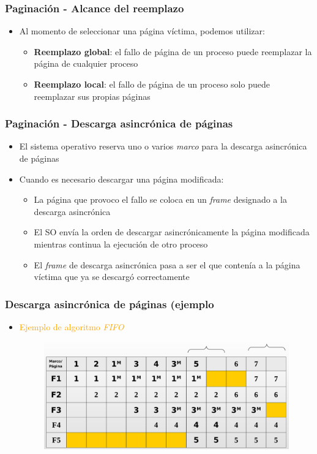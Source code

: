 \begin{frame}
  \frametitle{Paginación - Alcance del reemplazo}
  \begin{itemize}
  	\item Al momento de seleccionar una página víctima, podemos utilizar:
  	\begin{itemize}
  		\item \textbf{Reemplazo global}: el fallo de página de un proceso puede reemplazar la página de cualquier proceso
		\item \textbf{Reemplazo local}: el fallo de página de un proceso solo puede reemplazar sus propias páginas
  	\end{itemize}
  \end{itemize}
\end{frame}

\begin{frame}
  \frametitle{Paginación - Descarga asincrónica de páginas}
  \begin{itemize}
  	\item El sistema operativo reserva uno o varios \emph{marco} para la descarga asincrónica de páginas
  	\item Cuando es necesario descargar una página modificada:
  	\begin{itemize}
  		\item La página que provoco el fallo se coloca en un \emph{frame} designado a la descarga asincrónica
		\item El SO envía la orden de descargar asincrónicamente la página modificada mientras continua la ejecución de otro proceso
		\item El \emph{frame} de descarga asincrónica pasa a ser el que contenía a la página víctima que ya se descargó correctamente
  	\end{itemize}
  \end{itemize}
\end{frame}

\begin{frame}
  \frametitle{Descarga asincrónica de páginas (ejemplo}
  \begin{itemize}
  	\item \textcolor{orange}{Ejemplo de algoritmo \emph{FIFO}}
	\begin{figure}
	    \includegraphics[scale=0.2]{images/asyncDownload.png}
	\end{figure}  	
  \end{itemize}
\end{frame}

